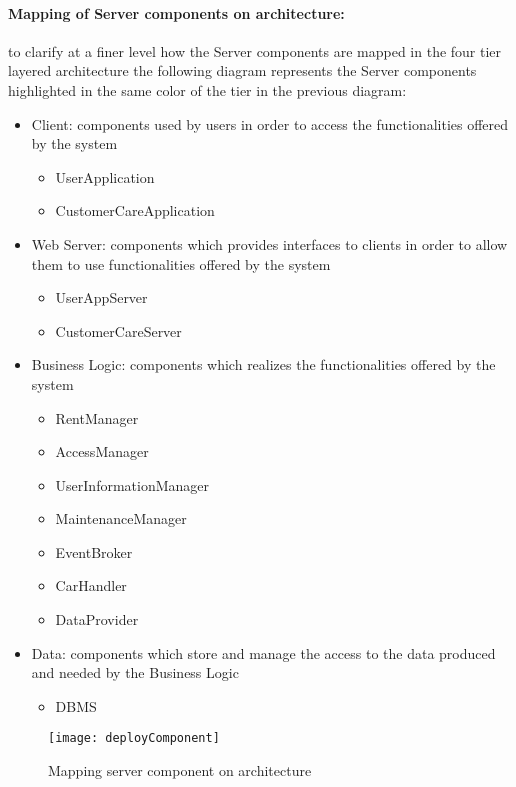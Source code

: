 \paragraph{Mapping of Server components on architecture:}to clarify at a finer level how the Server components are mapped in the four tier layered architecture the following diagram represents the Server components highlighted in the same color of the tier in the previous diagram:
\begin{itemize}
	\item Client: components used by users in order to access the functionalities offered by the system
		\begin{itemize}
			\item UserApplication
			\item CustomerCareApplication
		\end{itemize}
	\item Web Server: components which provides interfaces to clients in order to allow them to use functionalities offered by the system
		\begin{itemize}
			\item UserAppServer
			\item CustomerCareServer
		\end{itemize}
	\item Business Logic: components which realizes the functionalities offered by the system
		\begin{itemize}
			\item RentManager
			\item AccessManager
			\item UserInformationManager
			\item MaintenanceManager
			\item EventBroker
			\item CarHandler
			\item DataProvider
		\end{itemize}
	\item Data: components which store and manage the access to the data produced and needed by the Business Logic
		\begin{itemize}
			\item DBMS
		\end{itemize}
\end{itemize}

\begin{figure}[h]
			\centering
			\texttt{[image: deployComponent]}
			\caption{
				\label{fig:deployServerComponent} 
				Mapping server component on architecture
			}
		\end{figure}
\clearpage

